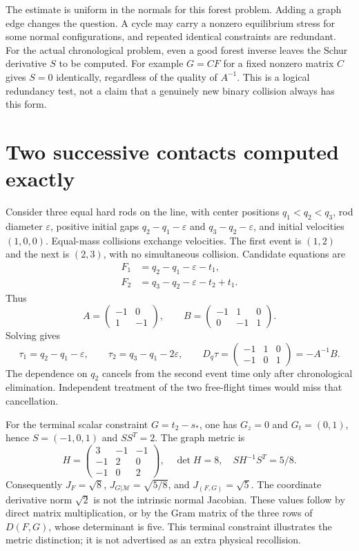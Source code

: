 \documentclass[11pt,reqno]{amsart}
\numberwithin{equation}{section}
\theoremstyle{remark}\newtheorem{remark}[theorem]{Remark}
\begin{document}
The estimate is uniform in the normals for this forest problem. Adding a graph edge changes the question. A cycle may carry a nonzero equilibrium stress for some normal configurations, and repeated identical constraints are redundant. For the actual chronological problem, even a good forest inverse leaves the Schur derivative $S$ to be computed. For example $G=CF$ for a fixed nonzero matrix $C$ gives $S=0$ identically, regardless of the quality of $A^{-1}$. This is a logical redundancy test, not a claim that a genuinely new binary collision always has this form.

\section{Two successive contacts computed exactly}
Consider three equal hard rods on the line, with center positions $q_1<q_2<q_3$, rod diameter $\varepsilon$, positive initial gaps $q_2-q_1-\varepsilon$ and $q_3-q_2-\varepsilon$, and initial velocities $(1,0,0)$. Equal-mass collisions exchange velocities. The first event is $(1,2)$ and the next is $(2,3)$, with no simultaneous collision. Candidate equations are
\begin{align*}
 F_1&=q_2-q_1-\varepsilon-t_1,\\
 F_2&=q_3-q_2-\varepsilon-t_2+t_1.
\end{align*}
Thus
\[
 A=\begin{pmatrix}-1&0\\1&-1\end{pmatrix},\qquad
 B=\begin{pmatrix}-1&1&0\\0&-1&1\end{pmatrix}.
\]
Solving gives
\[
 \tau_1=q_2-q_1-\varepsilon,
 \qquad \tau_2=q_3-q_1-2\varepsilon,
 \qquad D_q\tau=\begin{pmatrix}-1&1&0\\-1&0&1\end{pmatrix}=-A^{-1}B.
\]
The dependence on $q_2$ cancels from the second event time only after chronological elimination. Independent treatment of the two free-flight times would miss that cancellation.

For the terminal scalar constraint $G=t_2-s_*$, one has $G_z=0$ and $G_t=(0,1)$, hence $S=(-1,0,1)$ and $SS^T=2$. The graph metric is
\[
 H=\begin{pmatrix}3&-1&-1\\-1&2&0\\-1&0&2\end{pmatrix},
 \quad \det H=8,
 \quad SH^{-1}S^T=5/8.
\]
Consequently $J_F=\sqrt8$, $J_{G|\mathcal M}=\sqrt{5/8}$, and $J_{(F,G)}=\sqrt5$. The coordinate derivative norm $\sqrt2$ is not the intrinsic normal Jacobian. These values follow by direct matrix multiplication, or by the Gram matrix of the three rows of $D(F,G)$, whose determinant is five. This terminal constraint illustrates the metric distinction; it is not advertised as an extra physical recollision.
\end{document}
